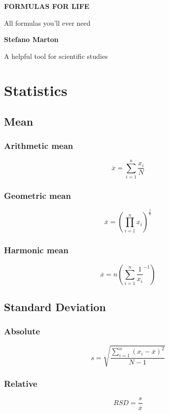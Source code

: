 \documentclass[a4paper]{report}
\makeatletter
\renewcommand\tableofcontents{%
    \begin{multicols}{2}[\section*{\contentsname
        \@mkboth{%
           \MakeUppercase\contentsname}{\MakeUppercase\contentsname}}]%
    \@starttoc{toc}%
    \end{multicols}%
    }
\makeatother
\begin{document}
\begin{titlepage}
    \begin{center}
        \vspace*{6cm}
            
        \Huge
        \textbf{FORMULAS FOR LIFE}
            
        \vspace{0.5cm}
        \LARGE
        All formulas you'll ever need
            
        \vspace{1.5cm}
            
        \textbf{Stefano Marton}
            
        \vfill
            
        A helpful tool for scientific studies   
            
        \vspace{0.8cm}
            
    \end{center}
\end{titlepage}

\small
\setcounter{tocdepth}{2}
\tableofcontents
\normalsize 
{}

\chapter{Statistics}

  \begin{multicols}{2}
    \section{Mean}
      \subsection{Arithmetic mean}
      $$\overline{x}= \sum_{i=1}^n \frac{x_i}{N}$$ 
      \subsection{Geometric mean}
      $$\overline{x}=(\prod_{i=1}^n x_i)^\frac{1}{n}$$
      \subsection{Harmonic mean}
      $$\overline{x}=n(\sum^n _{i=1} \frac{1}{x_i}^{-1})$$
    \section{Standard Deviation}
      \subsection{Absolute}
      $$s=\sqrt{\frac{\sum_{i=1}^n (x_i - \overline{x})^2}{N-1}} $$
      \subsection{Relative}
      $$RSD= \frac{s}{\overline{x}}$$
  \end{multicols}
\end{document}
